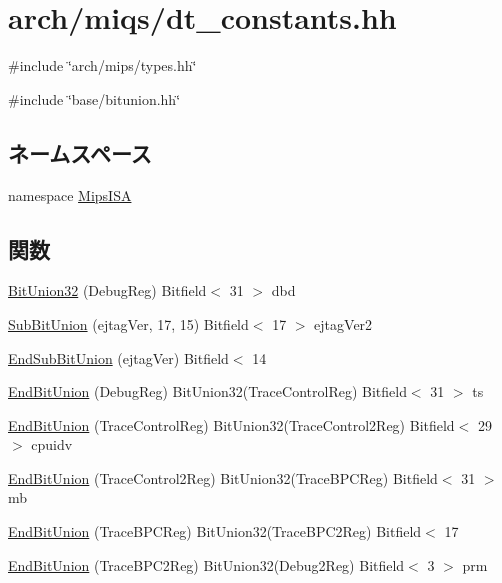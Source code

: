 \hypertarget{miqs_2dt__constants_8hh}{
\section{arch/miqs/dt\_\-constants.hh}
\label{miqs_2dt__constants_8hh}
}
{\ttfamily \#include \char`\"{}arch/mips/types.hh\char`\"{}}\par
{\ttfamily \#include \char`\"{}base/bitunion.hh\char`\"{}}\par
\subsection*{ネームスペース}
\begin{DoxyCompactItemize}
\item 
namespace \hyperlink{namespaceMipsISA}{MipsISA}
\end{DoxyCompactItemize}
\subsection*{関数}
\begin{DoxyCompactItemize}
\item 
\hyperlink{namespaceMipsISA_ab29959b11b97e2f28ab81dda7a828367}{BitUnion32} (DebugReg) Bitfield$<$ 31 $>$ dbd
\item 
\hyperlink{namespaceMipsISA_aada8c158cc81aa418c360bde1d4b9a59}{SubBitUnion} (ejtagVer, 17, 15) Bitfield$<$ 17 $>$ ejtagVer2
\item 
\hyperlink{namespaceMipsISA_ad1223c93dc1c573511a672beb68ed125}{EndSubBitUnion} (ejtagVer) Bitfield$<$ 14
\item 
\hyperlink{namespaceMipsISA_a74e5941d61677e3e49c387d644b057cb}{EndBitUnion} (DebugReg) BitUnion32(TraceControlReg) Bitfield$<$ 31 $>$ ts
\item 
\hyperlink{namespaceMipsISA_a8edb562d62f5bc109749bb5e5c51d9f1}{EndBitUnion} (TraceControlReg) BitUnion32(TraceControl2Reg) Bitfield$<$ 29 $>$ cpuidv
\item 
\hyperlink{namespaceMipsISA_af61b5ac7de0418d4ad6c186a7ca29d0c}{EndBitUnion} (TraceControl2Reg) BitUnion32(TraceBPCReg) Bitfield$<$ 31 $>$ mb
\item 
\hyperlink{namespaceMipsISA_a7a312f5d7bfedd7aeba964423eafec3d}{EndBitUnion} (TraceBPCReg) BitUnion32(TraceBPC2Reg) Bitfield$<$ 17
\item 
\hyperlink{namespaceMipsISA_a57be9529ca2847db116487077b34308f}{EndBitUnion} (TraceBPC2Reg) BitUnion32(Debug2Reg) Bitfield$<$ 3 $>$ prm
\end{DoxyCompactItemize}
